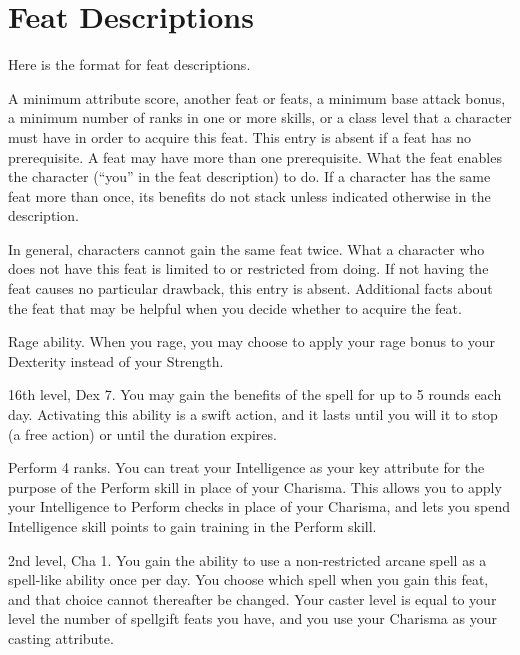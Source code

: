 \twocolumn

\section{Feat Descriptions}
Here is the format for feat descriptions.

 A minimum attribute score, another feat or feats, a minimum base attack bonus, a minimum number of ranks in one or more skills, or a class level that a character must have in order to acquire this feat. This entry is absent if a feat has no prerequisite. A feat may have more than one prerequisite.
 What the feat enables the character (``you'' in the feat description) to do. If a character has the same feat more than once, its benefits do not stack unless indicated otherwise in the description.
\par In general, characters cannot gain the same feat twice.
 What a character who does not have this feat is limited to or restricted from doing. If not having the feat causes no particular drawback, this entry is absent.
 Additional facts about the feat that may be helpful when you decide whether to acquire the feat.

\featpre Rage ability.
\featben When you rage, you may choose to apply your rage bonus to your Dexterity instead of your Strength.

\featpre 16th level, Dex 7.
\featben You may gain the benefits of the  spell for up to 5 rounds each day. Activating this ability is a swift action, and it lasts until you will it to stop (a free action) or until the duration expires.

\featpre Perform 4 ranks.
\featben You can treat your Intelligence as your key attribute for the purpose of the Perform skill in place of your Charisma. This allows you to apply your Intelligence to Perform checks in place of your Charisma, and lets you spend Intelligence skill points to gain training in the Perform skill.

\featpre 2nd level, Cha 1.
\featben You gain the ability to use a non-restricted arcane spell as a spell-like ability once per day. You choose which spell when you gain this feat, and that choice cannot thereafter be changed. Your caster level is equal to your level \add the number of spellgift feats you have, and you use your Charisma as your casting attribute.

